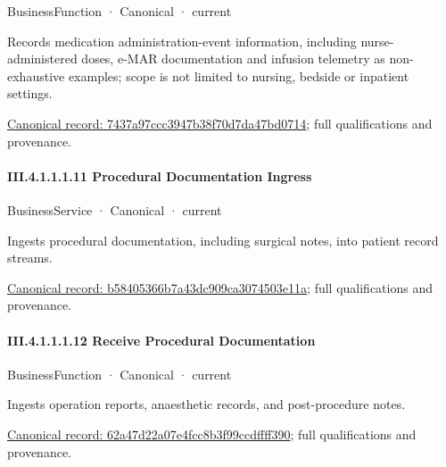 \label{element:7437a97ccc3947b38f70d7da47bd0714}
{\small BusinessFunction · Canonical · current}\par

Records medication administration-event information, including nurse-administered doses, e-MAR documentation and infusion telemetry as non-exhaustive examples; scope is not limited to nursing, bedside or inpatient settings.


{\footnotesize \href{../../../../../../../../continuum/business/business-function/7437a97ccc3947b38f70d7da47bd0714.md}{Canonical record: 7437a97ccc3947b38f70d7da47bd0714}; full qualifications and provenance.}\par
\paragraph*{III.4.1.1.1.11 Procedural Documentation Ingress}
\label{navigation:III.4.1.1.1.11}

\label{element:b58405366b7a43dc909ca3074503e11a}
{\small BusinessService · Canonical · current}\par

Ingests procedural documentation, including surgical notes, into patient record streams.


{\footnotesize \href{../../../../../../../../continuum/business/business-service/b58405366b7a43dc909ca3074503e11a.md}{Canonical record: b58405366b7a43dc909ca3074503e11a}; full qualifications and provenance.}\par
\paragraph*{III.4.1.1.1.12 Receive Procedural Documentation}
\label{navigation:III.4.1.1.1.12}

\label{element:62a47d22a07e4fcc8b3f99ccdffff390}
{\small BusinessFunction · Canonical · current}\par

Ingests operation reports, anaesthetic records, and post-procedure notes.


{\footnotesize \href{../../../../../../../../continuum/business/business-function/62a47d22a07e4fcc8b3f99ccdffff390.md}{Canonical record: 62a47d22a07e4fcc8b3f99ccdffff390}; full qualifications and provenance.}\par
